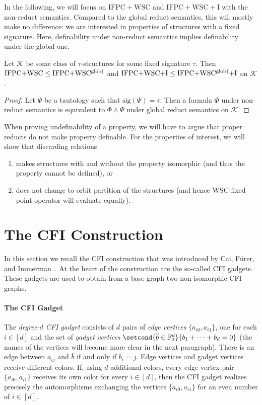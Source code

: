 \documentclass[]{lmcs}
\newcommand{\FF}{\mathbb{F}}
\newcommand{\defining}[1]{\emph{#1}}
\newcommand{\set}[1]{\lbrace #1 \rbrace}
\newcommand{\formA}{\Phi}
\newcommand{\formB}{\Psi}
\newcommand{\tup}[1]{\bar{#1}}
\newcommand{\GraphClass}{\mathcal{K}}
\newcommand{\sig}{\tau}
\newcommand{\sigOf}[1]{\mathrm{sig}(#1)}
\newcommand{\IFPCWSC}{\ensuremath{\mathrm{IFPC{+}WSC}}}
\newcommand{\IFPCWSCI}{\ensuremath{\mathrm{IFPC{+}WSC{+}I}}}
\begin{document}
In the following, we will focus on \IFPCWSC{} and \IFPCWSCI{} with the non-reduct semantics.
Compared to the global reduct semantics, this will mostly make no difference:
we are interested in properties of structures with a fixed signature.
Here, definability under non-reduct semantics implies definability under the global one.
\begin{lem}
	\label{lem:non-reduct-in-global-reduct-semantics-for-fixed-signature}
	Let $\GraphClass$ be some class of $\sig$-structures for some fixed signature $\sig$.
	Then  $\IFPCWSC \leq \IFPCWSCglob{}$ and
	$\IFPCWSCI \leq \IFPCWSCIglob{}$ on $\GraphClass$.
\end{lem}
\begin{proof}
	Let $\formB$ be a tautology such that $\sigOf{\formB} = \sig$.
	Then a formula $\formA$ under non-reduct semantics is equivalent to $\formA \land \formB$ under global reduct semantics on $\GraphClass$.
\end{proof}
When proving undefinability of a property,
we will have to argue that proper reducts
do not make property definable.
For the properties of interest, we will show that discarding relations
\begin{enumerate}
	\item makes structures with and without the property isomorphic (and thus the property cannot be defined), or
	\item does not change to orbit partition of the structures
	(and hence WSC-fixed point operator will evaluate equally).
\end{enumerate}


\section{The CFI Construction}
\label{sec:cfi-construction}
In this section we recall the CFI construction that was introduced by Cai, Fürer, and Immerman~\cite{CaiFI1992}.
At the heart of the construction are the so-called CFI gadgets.
These gadgets are used to obtain from a base graph two non-isomorphic CFI graphs.


\paragraph{The CFI Gadget}
The \defining{degree-$d$ CFI gadget} consists of $d$ pairs of \defining{edge vertices} $\set{a_{i0}, a_{i1}}$, one for each $i \in [d]$
and the set of \defining{gadget vertices} $\setcond{\tup{b} \in \FF_2^d}{b_1+\dots+b_d =0}$ (the names of the vertices will become more clear in the next paragraph).
There is an edge between $a_{ij}$ and $\tup{b}$ if and only if
$b_i = j$.
Edge vertices and gadget vertices receive different colors.
If, using $d$ additional colors, every edge-vertex-pair $\set{a_{i0}, a_{i1}}$ 
receives its own color for every $i \in[d]$,
then the CFI gadget realizes precisely the automorphisms
exchanging the vertices $\set{a_{i0}, a_{i1}}$ for an even number of $i \in[d]$.
\end{document}
